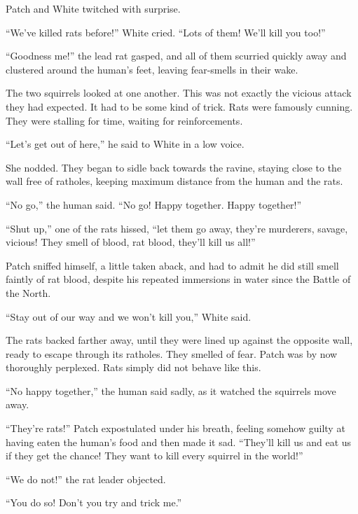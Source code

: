 \documentclass[ebook,oneside,openany,17pt]{memoir}
\newenvironment{tolerant}[1]{%
  \par\tolerance=#1\relax
}{%
  \par
}
\begin{document}
Patch and White twitched with surprise.

“We’ve killed rats before!” White cried. “Lots of them! We’ll kill you
too!”

“Goodness me!” the lead rat gasped, and all of them scurried quickly
away and clustered around the human’s feet, leaving fear-smells in
their wake.

The two squirrels looked at one another. This was not exactly the
vicious attack they had expected. It had to be some kind of
trick. Rats were famously cunning. They were stalling for time,
waiting for reinforcements.

“Let’s get out of here,” he said to White in a low voice.

She nodded. They began to sidle back towards the ravine, staying close
to the wall free of ratholes, keeping maximum distance from the human
and the rats.

“No go,” the human said. “No go! Happy together. Happy together!”

“Shut up,” one of the rats hissed, “let them go away, they’re
murderers, savage, vicious! They smell of blood, rat blood, they’ll
kill us all!”

Patch sniffed himself, a little taken aback, and had to admit he did
still smell faintly of rat blood, despite his repeated immersions in
water since the Battle of the North.

“Stay out of our way and we won’t kill you,” White said.

\begin{tolerant}{1000}
The rats backed farther away, until they were lined up against the
opposite wall, ready to escape through its ratholes. They smelled of
fear. Patch was by now thoroughly perplexed. Rats simply did not
behave like this.
\end{tolerant}

“No happy together,” the human said sadly, as it watched the squirrels
move away.

\begin{tolerant}{5000}
“They’re rats!” Patch expostulated under his breath, feeling somehow
guilty at having eaten the human’s food and then made it sad. “They’ll
kill us and eat us if they get the chance! They want to kill every
squirrel in the world!”
\end{tolerant}

“We do not!” the rat leader objected.

“You do so! Don’t you try and trick me.”
\end{document}
